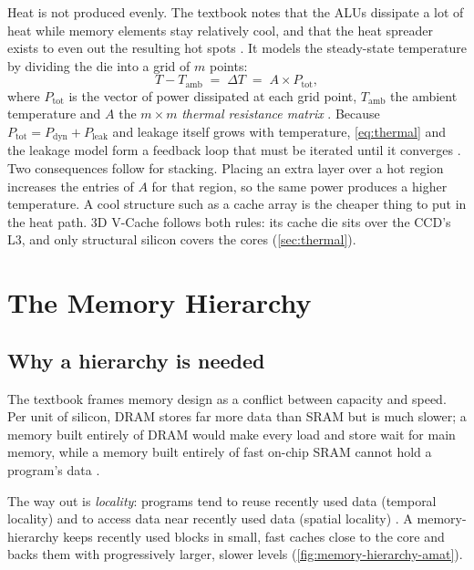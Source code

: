 Heat is not produced evenly. The textbook notes that the ALUs dissipate a lot of heat while memory elements stay relatively cool, and that the heat spreader exists to even out the resulting hot spots \cite[sec.~10.10.1]{sarangi2025basic}. It models the steady-state temperature by dividing the die into a grid of $m$ points:
\begin{equation}
  T - T_{\mathrm{amb}} \;=\; \Delta T \;=\; A \times P_{\mathrm{tot}},
  \label{eq:thermal}
\end{equation}
where $P_{\mathrm{tot}}$ is the vector of power dissipated at each grid point, $T_{\mathrm{amb}}$ the ambient temperature and $A$ the $m\times m$ \emph{thermal resistance matrix} \cite[sec.~10.10.4]{sarangi2025basic}. Because $P_{\mathrm{tot}} = P_{\mathrm{dyn}} + P_{\mathrm{leak}}$ and leakage itself grows with temperature, \cref{eq:thermal} and the leakage model form a feedback loop that must be iterated until it converges \cite[sec.~10.10.4]{sarangi2025basic}. Two consequences follow for stacking. Placing an extra layer over a hot region increases the entries of $A$ for that region, so the same power produces a higher temperature. A cool structure such as a cache array is the cheaper thing to put in the heat path. 3D V-Cache follows both rules: its cache die sits over the CCD's L3, and only structural silicon covers the cores (\cref{sec:thermal}).

\section{The Memory Hierarchy}
\label{sec:memory-hierarchy}

\subsection{Why a hierarchy is needed}

The textbook frames memory design as a conflict between capacity and speed. Per unit of silicon, DRAM stores far more data than SRAM but is much slower; a memory built entirely of DRAM would make every load and store wait for main memory, while a memory built entirely of fast on-chip SRAM cannot hold a program's data \cite[sec.~11.1.1]{sarangi2025basic}.

The way out is \emph{locality}: programs tend to reuse recently used data (temporal locality) and to access data near recently used data (spatial locality) \cite[sec.~11.1.2--11.1.6]{sarangi2025basic}. A \gls{memory-hierarchy} keeps recently used blocks in small, fast caches close to the core and backs them with progressively larger, slower levels (\cref{fig:memory-hierarchy-amat}).

